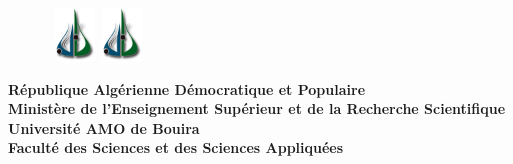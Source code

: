 \begin{titlepage}

  \begin{figure}[htbp]
   \hbox{
       \includegraphics[width=40px]{logo.png}
       \hspace*{12.5cm}
       \includegraphics[width=40px]{logo.png}
    }
  \end{figure}
  
  \vspace {-1.8cm}
  
  \begin{center}
  {\bf R\'{e}publique Alg\'{e}rienne D\'emocratique et Populaire\\
  Minist\`{e}re de l'Enseignement Sup\'{e}rieur et de la
  Recherche Scientifique} \vspace{0.2cm}\\
  
  {\bf {\large Universit\'{e} AMO de Bouira}}\\
  
  {\bf Facult\'{e} des Sciences et des Sciences Appliquées} \\
  

\end{center}
\end{titlepage}
